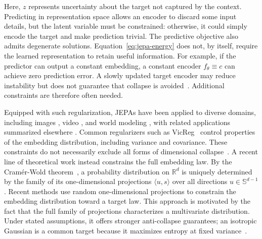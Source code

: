 \documentclass[acmsmall,screen,review,anonymous]{acmart}
\begin{document}
Here, $z$ represents uncertainty about the target not captured by the context.
%
Predicting in representation space allows an encoder to discard some input details, but the latent variable must be constrained: otherwise, it could simply encode the target and make prediction trivial.
%
The predictive objective also admits degenerate solutions.
%
Equation~\ref{eq:jepa-energy} does not, by itself, require the learned representation to retain useful information.
%
For example, if the predictor can output a constant embedding, a constant encoder $f_\theta\equiv c$ can achieve zero prediction error.
%
A slowly updated target encoder may reduce instability but does not guarantee that collapse is avoided~\citep{mo2024cjepa}.
%
Additional constraints are therefore often needed.

Equipped with such regularization, JEPAs have been applied to diverse domains, including images \citep{assran2023selfsupervisedlearningimagesjointembedding}, video \citep{bardes2024vjepa, assran2025vjepa2selfsupervisedvideo}, and world modeling \citep{psenka2026parallel, nam2026causaljepa}, with related applications summarized elsewhere \citep{klindt2026lejepa}.
%
Common regularizers such as VicReg~\citep{bardes2022vicreg} control properties of the embedding distribution, including variance and covariance.
%
These constraints do not necessarily exclude all forms of dimensional collapse~\citep{jing2022understanding}.
%
A recent line of theoretical work instead constrains the full embedding law.
%
By the Cram\'er-Wold theorem~\citep{cramerwold}, a probability distribution on $\mathbb{R}^d$ is uniquely determined by the family of its one-dimensional projections $\langle u, s \rangle$ over all directions $u \in \mathbb{S}^{d-1}$.
%
Recent methods use random one-dimensional projections to constrain the embedding distribution toward a target law.
%
This approach is motivated by the fact that the full family of projections characterizes a multivariate distribution.
%
Under stated assumptions, it offers stronger anti-collapse guarantees; an isotropic Gaussian is a common target because it maximizes entropy at fixed variance~\citep{balestriero2025lejepaprovablescalableselfsupervised, maes2026leworldmodelstableendtoendjointembedding, kuang2026rectified, huang2026semantic, wu2026visregvarianceinvariancesketchingregularizationjepa}.
\end{document}
